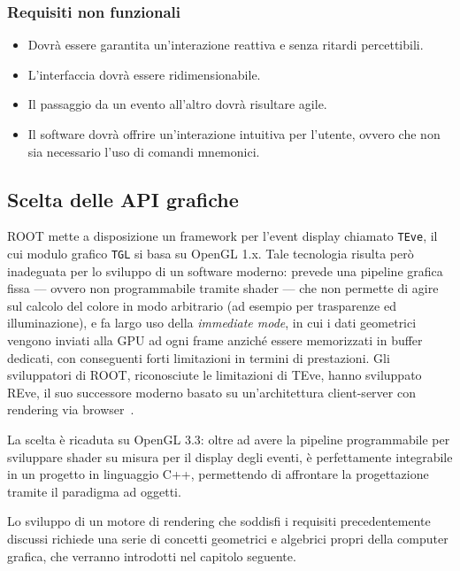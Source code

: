 \subsubsection{Requisiti non funzionali}
\begin{itemize}
	\item Dovrà essere garantita un'interazione reattiva e senza ritardi percettibili.
	\item L’interfaccia dovrà essere ridimensionabile.
    \item Il passaggio da un evento all'altro dovrà risultare agile.
  	\item Il software dovrà offrire un'interazione intuitiva per l'utente, ovvero che non sia necessario l'uso di comandi mnemonici.
\end{itemize}

\subsection{Scelta delle API grafiche}
ROOT mette a disposizione un framework per l'event display chiamato \texttt{TEve}, il cui modulo grafico \texttt{TGL} si basa su OpenGL 1.x.
Tale tecnologia risulta però inadeguata per lo sviluppo di un software moderno: prevede una pipeline grafica fissa --- ovvero non programmabile tramite shader --- che non permette di agire sul calcolo del colore in modo arbitrario (ad esempio per trasparenze ed illuminazione), e fa largo uso della \emph{immediate mode}, in cui i dati geometrici vengono inviati alla GPU ad ogni frame anziché essere memorizzati in buffer dedicati, con conseguenti forti limitazioni in termini di prestazioni.
Gli sviluppatori di ROOT, riconosciute le limitazioni di TEve, hanno sviluppato REve, il suo successore moderno basato su un'architettura client-server con rendering via browser~\cite{bohak_2024}.

La scelta è ricaduta su OpenGL 3.3: oltre ad avere la pipeline programmabile per sviluppare shader su misura per il display degli eventi, è perfettamente integrabile in un progetto in linguaggio C++, permettendo di affrontare la progettazione tramite il paradigma ad oggetti.

\bigskip
Lo sviluppo di un motore di rendering che soddisfi i requisiti precedentemente discussi richiede una serie di concetti geometrici e algebrici propri della computer grafica, che verranno introdotti nel capitolo seguente.